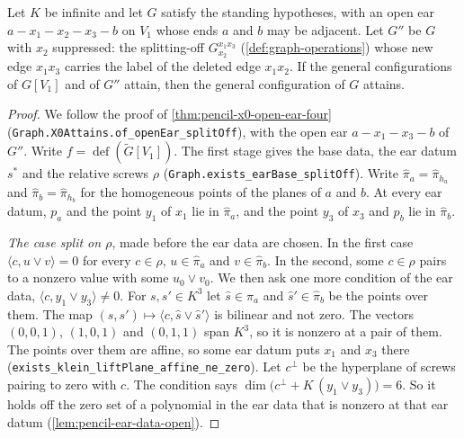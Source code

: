 \begin{theorem}
  \label{thm:pencil-x0-open-ear-three}
  \leanok
  Let $K$ be infinite and let $G$ satisfy the standing hypotheses, with
  an open ear $a - x_1 - x_2 - x_3 - b$ on $V_1$ whose ends $a$ and $b$
  may be adjacent. Let $G''$ be $G$ with $x_2$ suppressed: the
  splitting-off $G_{x_2}^{x_1 x_3}$ (\cref{def:graph-operations}) whose
  new edge $x_1 x_3$ carries the label of the deleted edge $x_1 x_2$. If
  the general configurations of $G[V_1]$ and of $G''$ attain, then the
  general configuration of $G$ attains.
\end{theorem}
\begin{proof}
  \leanok
  We follow the proof of \cref{thm:pencil-x0-open-ear-four}
  (\texttt{Graph.X0Attains.of\_openEar\_splitOff}), with the open ear
  $a - x_1 - x_3 - b$ of $G''$. Write
  $f = \operatorname{def}(\tilde G[V_1])$. The first stage gives the base
  data, the ear datum $s^*$ and the relative screws $\rho$
  (\texttt{Graph.exists\_earBase\_splitOff}). Write
  $\hat\pi_a = \hat\pi_{h_a}$ and $\hat\pi_b = \hat\pi_{h_b}$ for the
  homogeneous points of the planes of $a$ and $b$. At every ear datum,
  $p_a$ and the point $y_1$ of $x_1$ lie in $\hat\pi_a$, and the point
  $y_3$ of $x_3$ and $p_b$ lie in $\hat\pi_b$.

  \emph{The case split on $\rho$}, made before the ear data are chosen.
  In the first case $\langle c, u \vee v \rangle = 0$ for every
  $c \in \rho$, $u \in \hat\pi_a$ and $v \in \hat\pi_b$. In the second,
  some $c \in \rho$ pairs to a nonzero value with some $u_0 \vee v_0$.
  We then ask one more condition of the ear data,
  $\langle c, y_1 \vee y_3 \rangle \neq 0$. For $s, s' \in K^3$ let
  $\hat s \in \hat\pi_a$ and $\hat s' \in \hat\pi_b$ be the points over
  them. The map $(s, s') \mapsto \langle c, \hat s \vee \hat s' \rangle$
  is bilinear and not zero. The vectors $(0, 0, 1)$, $(1, 0, 1)$ and
  $(0, 1, 1)$ span $K^3$, so it is nonzero at a pair of them. The points
  over them are affine, so some ear datum puts $x_1$ and $x_3$ there
  (\texttt{exists\_klein\_liftPlane\_affine\_ne\_zero}). Let $c^\perp$ be
  the hyperplane of screws pairing to zero with $c$. The condition says
  $\dim\bigl(c^\perp + K\,(y_1 \vee y_3)\bigr) = 6$. So it holds off the
  zero set of a polynomial in the ear data that is nonzero at that ear
  datum (\cref{lem:pencil-ear-data-open}).


\end{proof}
